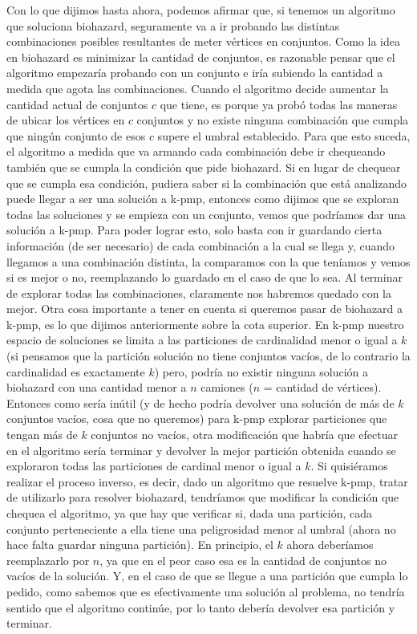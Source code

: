 \documentclass[a4paper]{article}
\begin{document}
\newline Con lo que dijimos hasta ahora, podemos afirmar que, si tenemos un algoritmo que soluciona biohazard, seguramente va a ir probando las distintas combinaciones posibles resultantes de meter vértices en conjuntos. Como la idea en biohazard es minimizar la cantidad de conjuntos, es razonable pensar que el algoritmo empezaría probando con un conjunto e iría subiendo la cantidad a medida que agota las combinaciones. Cuando el algoritmo decide aumentar la cantidad actual de conjuntos $c$ que tiene, es porque ya probó todas las maneras de ubicar los vértices en $c$ conjuntos y no existe ninguna combinación que cumpla que ningún conjunto de esos $c$ supere el umbral establecido. Para que esto suceda, el algoritmo a medida que va armando cada combinación debe ir chequeando también que se cumpla la condición que pide biohazard. Si en lugar de chequear que se cumpla esa condición, pudiera saber si la combinación que está analizando puede llegar a ser una solución a k-pmp, entonces como dijimos que se exploran todas las soluciones y se empieza con un conjunto, vemos que podríamos dar una solución a k-pmp. Para poder lograr esto, solo basta con ir guardando cierta información (de ser necesario) de cada combinación a la cual se llega y, cuando llegamos a una combinación distinta, la comparamos con la que teníamos y vemos si es mejor o no, reemplazando lo guardado en el caso de que lo sea. Al terminar de explorar todas las combinaciones, claramente nos habremos quedado con la mejor. Otra cosa importante a tener en cuenta si queremos pasar de biohazard a k-pmp, es lo que dijimos anteriormente sobre la cota superior. En k-pmp nuestro espacio de soluciones se limita a las particiones de cardinalidad menor o igual a $k$ (si pensamos que la partición solución no tiene conjuntos vacíos, de lo contrario la cardinalidad es exactamente $k$) pero, podría no existir ninguna solución a biohazard con una cantidad menor a $n$ camiones ($n$ = cantidad de vértices). Entonces como sería inútil (y de hecho podría devolver una solución de más de $k$ conjuntos vacíos, cosa que no queremos) para k-pmp explorar particiones que tengan más de $k$ conjuntos no vacíos, otra modificación que habría que efectuar en el algoritmo sería terminar y devolver la mejor partición obtenida cuando se exploraron todas las particiones de cardinal menor o igual a $k$.
\newline Si quisiéramos realizar el proceso inverso, es decir, dado un algoritmo que resuelve k-pmp, tratar de utilizarlo para resolver biohazard, tendríamos que modificar la condición que chequea el algoritmo, ya que hay que verificar si, dada una partición, cada conjunto perteneciente a ella tiene una peligrosidad menor al umbral (ahora no hace falta guardar ninguna partición). En principio, el $k$ ahora deberíamos reemplazarlo por $n$, ya que en el peor caso esa es la cantidad de conjuntos no vacíos de la solución. Y, en el caso de que se llegue a una partición que cumpla lo pedido, como sabemos que es efectivamente una solución al problema, no tendría sentido que el algoritmo continúe, por lo tanto debería devolver esa partición y terminar.
\end{document}
